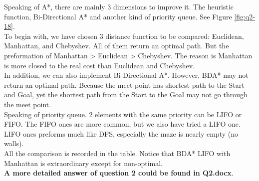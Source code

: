 \documentclass[letter]{article}
\begin{document}
\begin{questions}
	Speaking of A*, there are mainly 3 dimensions to improve it. The heuristic function, Bi-Directional A* and another kind of priority queue. See Figure \ref{fig:q2-18}.\\
	
	To begin with, we have chosen 3 distance function to be compared: Euclidean, Manhattan, and Chebyshev. All of them return an optimal path. But the preformation of Manhattan > Euclidean > Chebyshev. The reason is Manhattan is more closed to the real cost than Euclidean and Chebyshev. \\
	
	In addition, we can also implement Bi-Directional A*. However, BDA* may not return an optimal path. Because the meet point has shortest path to the Start and Goal, yet the shortest path from the Start to the Goal may not go through the meet point. \\
	
	Speaking of priority queue. 2 elements with the same priority can be LIFO or FIFO. The FIFO ones are more common, but we also have tried a LIFO one. LIFO ones preforms much like DFS, especially the maze is nearly empty (no walls). \\
	
	All the comparison is recorded in the table. Notice that BDA* LIFO with Manhattan is extraordinary except for non-optimal. \\
	
	\textbf{A more detailed answer of question 2 could be found in Q2.docx}.
	

\end{questions}
\end{document}
